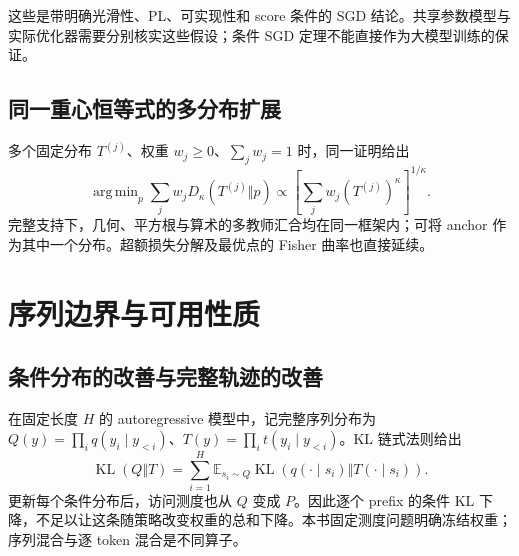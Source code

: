 \documentclass[lang=cn,scheme=chinese,openany]{../book/elegantbook}
\newcommand{\E}{\mathbb E}
\newcommand{\KL}{\operatorname{KL}}
\DeclareMathOperator*{\argmin}{arg\,min}
\begin{document}
这些是带明确光滑性、PL、可实现性和 score 条件的 SGD 结论。共享参数模型与实际优化器需要分别核实这些假设；条件 SGD 定理不能直接作为大模型训练的保证。



\subsection{同一重心恒等式的多分布扩展}

多个固定分布 $T^{(j)}$、权重 $w_j\ge0$、$\sum_jw_j=1$ 时，同一证明给出
\begin{equation}
 \argmin_p\sum_jw_jD_\kappa(T^{(j)}\Vert p)
 \propto\left[\sum_jw_j(T^{(j)})^\kappa\right]^{1/\kappa}.
\end{equation}
完整支持下，几何、平方根与算术的多教师汇合均在同一框架内；可将 anchor 作为其中一个分布。超额损失分解及最优点的 Fisher 曲率也直接延续。




\section{序列边界与可用性质}
\label{sec:power-scope}

\subsection{条件分布的改善与完整轨迹的改善}

在固定长度 $H$ 的 autoregressive 模型中，记完整序列分布为 $Q(y)=\prod_iq(y_i\mid y_{<i})$、$T(y)=\prod_it(y_i\mid y_{<i})$。KL 链式法则给出
\begin{equation}
 \KL(Q\Vert T)=\sum_{i=1}^H\E_{s_i\sim Q}\KL(q(\cdot\mid s_i)\Vert T(\cdot\mid s_i)).
 \label{eq:proximal-sequence-chain}
\end{equation}
更新每个条件分布后，访问测度也从 $Q$ 变成 $P$。因此逐个 prefix 的条件 KL 下降，不足以让这条随策略改变权重的总和下降。本书固定测度问题明确冻结权重；序列混合与逐 token 混合是不同算子。
\end{document}
